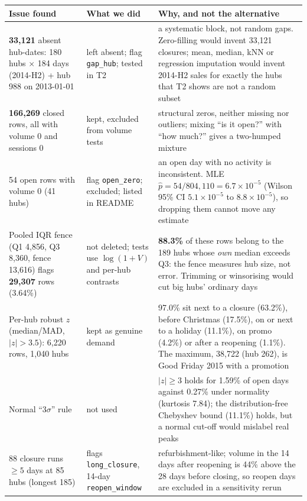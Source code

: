 \documentclass[10pt,a4paper,twocolumn]{article}
\renewcommand{\arraystretch}{1.25}
\newcommand{\key}[1]{\textbf{\textcolor{keyblue}{#1}}}
\newcommand{\code}[1]{\texttt{#1}}
\begin{document}
{\scriptsize
\renewcommand{\arraystretch}{1.12}
\begin{tabularx}{\linewidth}{@{}L{2.05cm} L{2.0cm} Y@{}}
\toprule
\textbf{Issue found} & \textbf{What we did} & \textbf{Why, and not the alternative} \\
\midrule
\key{33{,}121} absent hub-dates: 180 hubs $\times$ 184 days (2014-H2) + hub 988 on 2013-01-01
 & left absent; flag \code{gap\_hub}; tested in T2
 & a systematic block, not random gaps. Zero-filling would invent 33{,}121 closures; mean, median, kNN or regression
   imputation would invent 2014-H2 sales for exactly the hubs that T2 shows are not a random subset \\
\key{166{,}269} closed rows, all with volume 0 and sessions 0
 & kept, excluded from volume tests
 & structural zeros, neither missing nor outliers; mixing ``is it open?'' with ``how much?'' gives a two-humped mixture \\
54 open rows with volume 0 (41 hubs)
 & flag \code{open\_zero}; excluded; listed in README
 & an open day with no activity is inconsistent. MLE $\hat p=54/804{,}110=6.7\times10^{-5}$ (Wilson 95\% CI
   $5.1\times10^{-5}$ to $8.8\times10^{-5}$), so dropping them cannot move any estimate \\
Pooled IQR fence (Q1 4{,}856, Q3 8{,}360, fence 13{,}616) flags \key{29{,}307} rows (3.64\%)
 & not deleted; tests use $\log(1+V)$ and per-hub contrasts
 & \key{88.3\%} of these rows belong to the 189 hubs whose \emph{own} median exceeds Q3: the fence measures hub size,
   not error. Trimming or winsorising would cut big hubs' ordinary days \\
Per-hub robust $z$ (median/MAD, $|z|>3.5$): 6{,}220 rows, 1{,}040 hubs
 & kept as genuine demand
 & 97.0\% sit next to a closure (63.2\%), before Christmas (17.5\%), on or next to a holiday (11.1\%), on promo
   (4.2\%) or after a reopening (1.1\%). The maximum, 38{,}722 (hub 262), is Good Friday 2015 with a promotion \\
Normal ``3$\sigma$'' rule
 & not used
 & $|z|\ge3$ holds for 1.59\% of open days against 0.27\% under normality (kurtosis 7.84); the distribution-free
   Chebyshev bound (11.1\%) holds, but a normal cut-off would mislabel real peaks \\
88 closure runs $\ge5$ days at 85 hubs (longest 185)
 & flags \code{long\_closure}, 14-day \code{reopen\_window}
 & refurbishment-like; volume in the 14 days after reopening is 44\% above the 28 days before closing, so reopen days
   are excluded in a sensitivity rerun \\

\end{tabularx}}
\end{document}
